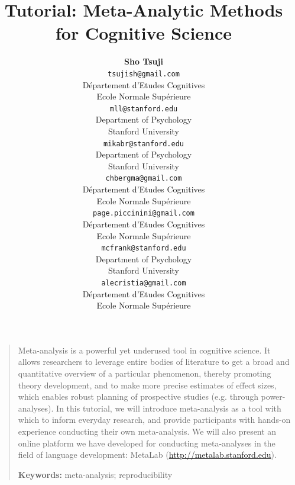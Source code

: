 \documentclass[10pt,letterpaper]{article}
\title{Tutorial: Meta-Analytic Methods for Cognitive Science}
\author{{\large \bf Sho Tsuji } \\
    \texttt{tsujish@gmail.com}\\
  D\'epartement d'Etudes Cognitives\\
   Ecole Normale Sup\'erieure
  \And {\large \bf Molly Lewis} \\
  \texttt{mll@stanford.edu}\\
    Department of Psychology\\
    Stanford University
  \And {\large \bf Mika Braginsky} \\
    \texttt{mikabr@stanford.edu}\\
      Department of Psychology\\
      Stanford University
  \AND {\large \bf Christina Bergmann} \\
      \texttt{chbergma@gmail.com}\\
  D\'epartement d'Etudes Cognitives\\
   Ecole Normale Sup\'erieure
     \And      {\large \bf Page Piccinini } \\
     \texttt{page.piccinini@gmail.com}\\
  D\'epartement d'Etudes Cognitives\\
   Ecole Normale Sup\'erieure
  \And        {\large \bf Michael C. Frank} \\
     \texttt{mcfrank@stanford.edu}\\
            Department of Psychology \\
            Stanford University
  \AND          {\large \bf Alejandrina Cristia} \\
      \texttt{alecristia@gmail.com}\\
  D\'epartement d'Etudes Cognitives\\
   Ecole Normale Sup\'erieure}
\begin{document}
\maketitle

\begin{quote}
\small
Meta-analysis is a powerful yet underused tool in cognitive science. It allows researchers to leverage entire bodies of literature to get a broad and quantitative overview of a particular phenomenon, thereby promoting theory development, and to make more precise estimates of effect sizes, which enables robust planning of prospective studies (e.g. through power-analyses). In this tutorial, we will introduce meta-analysis as a tool with which to inform everyday research, and provide participants with hands-on experience conducting their own meta-analysis. We will also present an online platform we have developed for conducting meta-analyses in the field of language development: MetaLab (\url{http://metalab.stanford.edu}). 

\textbf{Keywords:}
meta-analysis; reproducibility
\end{quote}


\end{document}
